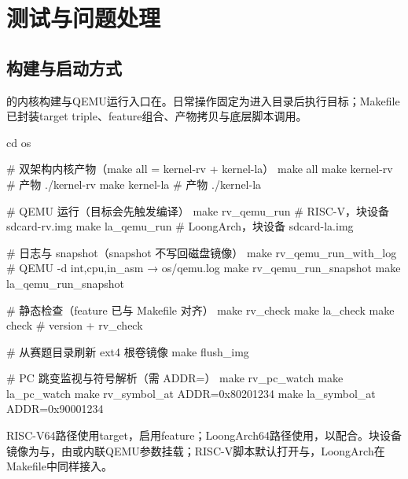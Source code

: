 %
%

\chapter{测试与问题处理}

\section{构建与启动方式}

\wateros{}的内核构建与QEMU运行入口在。日常操作固定为进入目录后执行目标；Makefile已封装target triple、feature组合、产物拷贝与底层脚本调用。

\begin{bashcode}
cd os

# 双架构内核产物（make all = kernel-rv + kernel-la）
make all
make kernel-rv        # 产物 ./kernel-rv
make kernel-la        # 产物 ./kernel-la

# QEMU 运行（目标会先触发编译）
make rv_qemu_run      # RISC-V，块设备 sdcard-rv.img
make la_qemu_run      # LoongArch，块设备 sdcard-la.img

# 日志与 snapshot（snapshot 不写回磁盘镜像）
make rv_qemu_run_with_log     # QEMU -d int,cpu,in_asm → os/qemu.log
make rv_qemu_run_snapshot
make la_qemu_run_snapshot

# 静态检查（feature 已与 Makefile 对齐）
make rv_check
make la_check
make check            # version + rv_check

# 从赛题目录刷新 ext4 根卷镜像
make flush_img

# PC 跳变监视与符号解析（需 ADDR=）
make rv_pc_watch
make la_pc_watch
make rv_symbol_at ADDR=0x80201234
make la_symbol_at ADDR=0x90001234
\end{bashcode}

RISC-V64路径使用target，启用feature；LoongArch64路径使用，以配合。块设备镜像为与，由或内联QEMU参数挂载；RISC-V脚本默认打开与，LoongArch在Makefile中同样接入。

